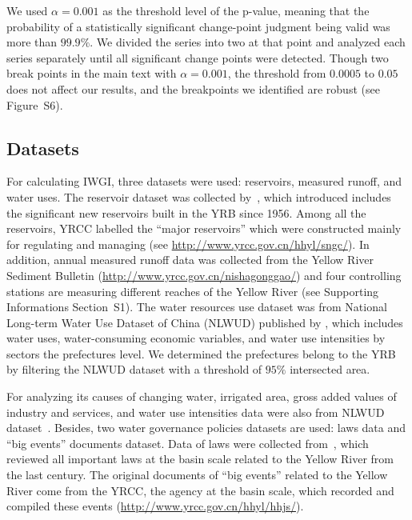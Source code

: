 \documentclass[draft]{../agujournal2019}
\begin{document}
We used $\alpha = 0.001$ as the threshold level of the p-value, meaning that the probability of a statistically significant change-point judgment being valid was more than $99.9\%$. We divided the series into two at that point and analyzed each series separately until all significant change points were detected. Though two break points in the main text with $\alpha = 0.001$, the threshold from $0.0005$ to $0.05$ does not affect our results, and the breakpoints we identified are robust (see Figure~S6).

	\subsection{Datasets}\label{sec:datasets}

	For calculating IWGI, three datasets were used: reservoirs, measured runoff, and water uses.
	The reservoir dataset was collected by~, which introduced includes the significant new reservoirs built in the YRB since 1956.
	Among all the reservoirs, YRCC labelled the ``major reservoirs'' which were constructed mainly for regulating and managing (see \url{http://www.yrcc.gov.cn/hhyl/sngc/}).
	In addition, annual measured runoff data was collected from the Yellow River Sediment Bulletin (\url{http://www.yrcc.gov.cn/nishagonggao/}) and four controlling stations are measuring different reaches of the Yellow River (see Supporting Informations Section~S1).
	The water resources use dataset was from National Long-term Water Use Dataset of China (NLWUD) published by , which includes water uses, water-consuming economic variables, and water use intensities by sectors the prefectures level.
	We determined the prefectures belong to the YRB by filtering the NLWUD dataset with a threshold of $95\%$ intersected area.

	For analyzing its causes of changing water, irrigated area, gross added values of industry and services, and water use intensities data were also from NLWUD dataset~\cite{zhou2020}.
	Besides, two water governance policies datasets are used: laws data and ``big events'' documents dataset.
	Data of laws were collected from~, which reviewed all important laws at the basin scale related to the Yellow River from the last century.
	The original documents of ``big events'' related to the Yellow River come from the YRCC, the agency at the basin scale, which recorded and compiled these events (\url{http://www.yrcc.gov.cn/hhyl/hhjs/}).
\end{document}
